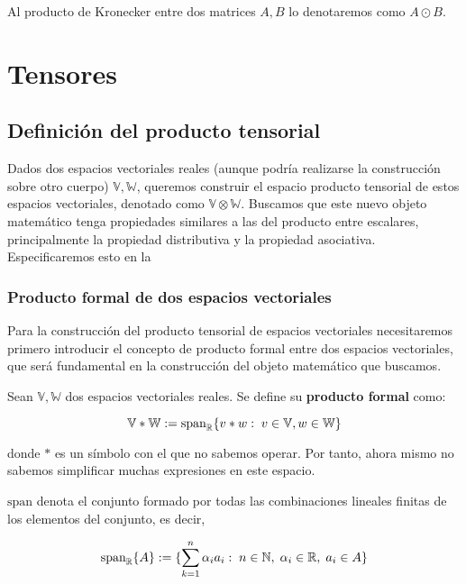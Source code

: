 Al producto de Kronecker entre dos matrices $A, B$ lo denotaremos como $A \odot B$.

\section{Tensores}

\subsection{Definición del producto tensorial} \label{sec:deftensor}

Dados dos espacios vectoriales reales (aunque podría realizarse la construcción sobre otro cuerpo) $\mathbb{V}, \mathbb{W}$, queremos construir el espacio producto tensorial de estos espacios vectoriales, denotado como $\mathbb{V} \otimes \mathbb{W}$. Buscamos que este nuevo objeto matemático tenga propiedades similares a las del producto entre escalares, principalmente la propiedad distributiva y la propiedad asociativa. Especificaremos esto en la 

\subsubsection{Producto formal de dos espacios vectoriales}

Para la construcción del producto tensorial de espacios vectoriales necesitaremos primero introducir el concepto de producto formal entre dos espacios vectoriales, que será fundamental en la construcción del objeto matemático que buscamos.

\begin{definicion}
	Sean $\mathbb{V}, \mathbb{W}$ dos espacios vectoriales reales. Se define su \textbf{producto formal} como:

	\begin{equation}
		\mathbb{V} \ast \mathbb{W} := \text{span}_{\mathbb{R}} \{ v \ast w : \; v \in \mathbb{V}, w \in \mathbb{W} \}
	\end{equation}

	donde $*$ es un símbolo con el que no sabemos operar. Por tanto, ahora mismo no sabemos simplificar muchas expresiones en este espacio.
\end{definicion}

\begin{observacion}
	$\text{span}$ denota el conjunto formado por todas las combinaciones lineales finitas de los elementos del conjunto, es decir,

	\begin{equation}
		\text{span}_{\mathbb{R}} \{ A \} := \{ \sum_{k = 1}^n \alpha_i a_i : \; n \in \mathbb{N}, \; \alpha_i \in \mathbb{R}, \; a_i \in A \}
	\end{equation}
\end{observacion}

